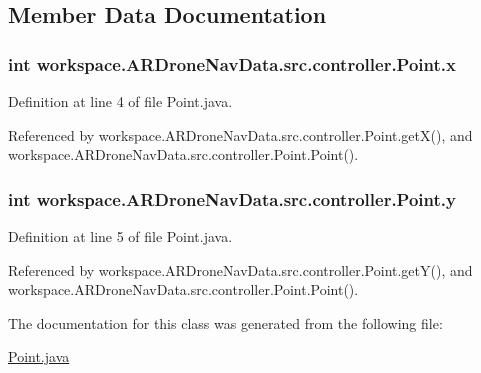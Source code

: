 \subsection{Member Data Documentation}
\hypertarget{classworkspace_1_1_a_r_drone_nav_data_1_1src_1_1controller_1_1_point_a8d4acd5ce5b1ecd9aee12297fa92dd81}{}
\subsubsection[{x}]{\setlength{\rightskip}{0pt plus 5cm}int workspace.\+A\+R\+Drone\+Nav\+Data.\+src.\+controller.\+Point.\+x\hspace{0.3cm}{\ttfamily [private]}}\label{classworkspace_1_1_a_r_drone_nav_data_1_1src_1_1controller_1_1_point_a8d4acd5ce5b1ecd9aee12297fa92dd81}


Definition at line 4 of file Point.\+java.



Referenced by workspace.\+A\+R\+Drone\+Nav\+Data.\+src.\+controller.\+Point.\+get\+X(), and workspace.\+A\+R\+Drone\+Nav\+Data.\+src.\+controller.\+Point.\+Point().

\hypertarget{classworkspace_1_1_a_r_drone_nav_data_1_1src_1_1controller_1_1_point_ab5594ca87f8ea9afd474efa2c193395e}{}
\subsubsection[{y}]{\setlength{\rightskip}{0pt plus 5cm}int workspace.\+A\+R\+Drone\+Nav\+Data.\+src.\+controller.\+Point.\+y\hspace{0.3cm}{\ttfamily [private]}}\label{classworkspace_1_1_a_r_drone_nav_data_1_1src_1_1controller_1_1_point_ab5594ca87f8ea9afd474efa2c193395e}


Definition at line 5 of file Point.\+java.



Referenced by workspace.\+A\+R\+Drone\+Nav\+Data.\+src.\+controller.\+Point.\+get\+Y(), and workspace.\+A\+R\+Drone\+Nav\+Data.\+src.\+controller.\+Point.\+Point().



The documentation for this class was generated from the following file\+:\begin{DoxyCompactItemize}
\item 
\hyperlink{_point_8java}{Point.\+java}\end{DoxyCompactItemize}
